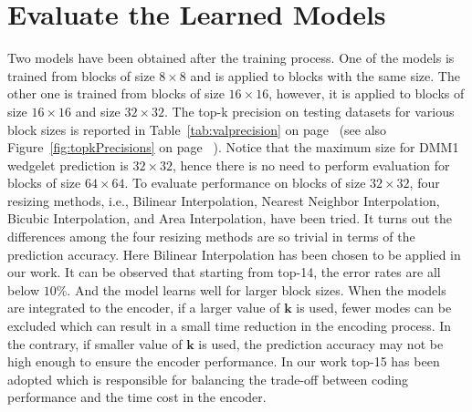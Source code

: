 \section{Evaluate the Learned Models}\label{sec:eval-section}
Two models have been obtained after the training process.
One of the models is trained from blocks of size \(8\times8\) and 
is applied to blocks with the same size.
The other one is trained from blocks of size \(16\times16\), however, 
it is applied to blocks of size \(16\times16\) and size \(32\times32\).
The top-k precision on testing datasets for various 
block sizes is reported in
Table~\ref{tab:valprecision} 
on page~\pageref{tab:valprecision}
(see also Figure~\ref{fig:topkPrecisions}
on page~\pageref{fig:topkPrecisions}
).
Notice that the maximum size for DMM1 wedgelet prediction 
is \(32\times32\), hence there is no need to perform evaluation 
for blocks of size \(64\times64\).
To evaluate performance on blocks of size \(32\times32\),
four resizing methods, i.e., Bilinear Interpolation, 
Nearest Neighbor Interpolation, 
Bicubic Interpolation, and
Area Interpolation,
have been tried.
It turns out the differences among 
the four resizing methods are so trivial
in terms of the prediction accuracy.
Here Bilinear Interpolation
has been chosen to be applied in our work.
It can be observed that starting from top-14,
the error rates are all below \(10\% \).
And the model learns well for larger block sizes.
When the models are integrated to the encoder,
if a larger value of \(\mathbf{k}\) is used, 
fewer modes can be excluded which can 
result in a small time reduction in the encoding process.
In the contrary, if smaller value of \(\mathbf{k}\) is used,
the prediction accuracy may not be high enough
to ensure the encoder performance.
In our work top-15 has been adopted which 
is responsible for balancing
the trade-off between coding performance and 
the time cost in the encoder.



